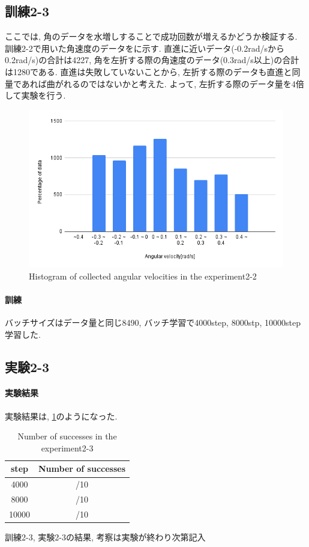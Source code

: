 \subsection{訓練2-3}
ここでは, 角のデータを水増しすることで成功回数が増えるかどうか検証する. 訓練2-2で用いた角速度のデータをに示す. 直進に近いデータ(-0.2rad/sから0.2rad/s)の合計は4227, 角を左折する際の角速度のデータ(0.3rad/s以上)の合計は1280である. 直進は失敗していないことから, 左折する際のデータも直進と同量であれば曲がれるのではないかと考えた. よって, 左折する際のデータ量を4倍して実験を行う. 

\begin{figure}[h]
  \centering
  \includegraphics[keepaspectratio, scale=0.6]{images/exp3.png}
  \caption{Histogram of collected angular velocities in the experiment2-2}
  \label{Fig:exp3}
  \end{figure}

\paragraph{訓練}
バッチサイズはデータ量と同じ8490, バッチ学習で4000step, 8000stp, 10000step学習した. 

\newpage
\subsection{実験2-3}

\paragraph{実験結果}
実験結果は, \ref{tb:exp4}のようになった. 

\begin{table}[h]
  \centering
  \begin{tabular}{|c|c|} \hline
    step & Number of successes \\ \hline
    4000 & /10 \\ \hline
    8000 & /10 \\ \hline
    10000 & /10 \\ \hline
  \end{tabular}
  \caption{Number of successes in the experiment2-3}
  \label{tb:exp4}
\end{table}

訓練2-3, 実験2-3の結果, 考察は実験が終わり次第記入